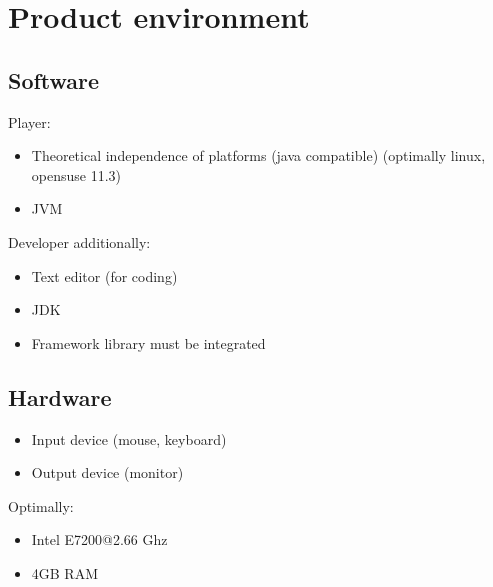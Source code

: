 \section{Product environment}

\subsection{Software}
Player:
\begin{itemize}
\item Theoretical independence of platforms (\Gls{java} compatible) (optimally \gls{linux}, \gls{opensuse} 11.3)
\item \Gls{JVM}
\end{itemize}
Developer additionally:
\begin{itemize}
\item Text editor (for coding)
\item \Gls{JDK}
\item Framework library must be integrated
\end{itemize}

\subsection{Hardware}
\begin{itemize}
\item Input device (mouse, keyboard)
\item Output device (monitor)
\end{itemize}
Optimally:
\begin{itemize}
\item Intel E7200@2.66 Ghz
\item 4GB RAM
\end{itemize}